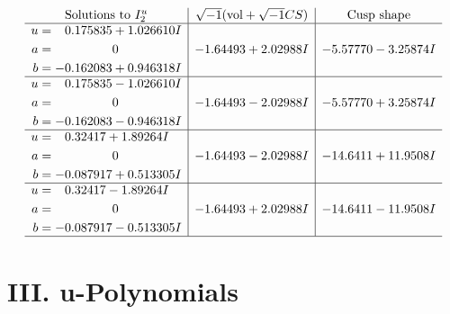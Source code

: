 \documentclass[1p]{elsarticle_modified}
\theoremstyle{definition}
\newcommand{\I}{\sqrt{-1}}
\begin{document}
$$\begin{array}{c|c|c}  
\text{Solutions to }I^u_{2}& \I (\text{vol} + \sqrt{-1}CS) & \text{Cusp shape}\\
 \hline 
\begin{aligned}
u &= \phantom{-}0.175835 + 1.026610 I \\
a &= \phantom{-0.000000 } 0 \\
b &= -0.162083 + 0.946318 I\end{aligned}
 & -1.64493 + 2.02988 I & -5.57770 - 3.25874 I \\ \hline\begin{aligned}
u &= \phantom{-}0.175835 - 1.026610 I \\
a &= \phantom{-0.000000 } 0 \\
b &= -0.162083 - 0.946318 I\end{aligned}
 & -1.64493 - 2.02988 I & -5.57770 + 3.25874 I \\ \hline\begin{aligned}
u &= \phantom{-}0.32417 + 1.89264 I \\
a &= \phantom{-0.000000 } 0 \\
b &= -0.087917 + 0.513305 I\end{aligned}
 & -1.64493 - 2.02988 I & -14.6411 + 11.9508 I \\ \hline\begin{aligned}
u &= \phantom{-}0.32417 - 1.89264 I \\
a &= \phantom{-0.000000 } 0 \\
b &= -0.087917 - 0.513305 I\end{aligned}
 & -1.64493 + 2.02988 I & -14.6411 - 11.9508 I\\
 \hline 
 \end{array}$$\newpage
\newpage\renewcommand{\arraystretch}{1}
\centering \section*{ III. u-Polynomials}
\end{document}
